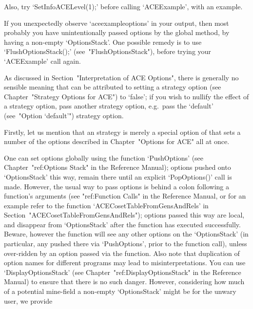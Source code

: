 Also, try `SetInfoACELevel(1);' before  calling `ACEExample', with  an
example.

If you unexpectedly observe `aceexampleoptions' in your  output,  then
most probably you have unintentionally passed options  by  the  global
method, by having a non-empty `OptionsStack'. One possible  remedy  is
to use `FlushOptionsStack();' (see~"FlushOptionsStack"), before trying
your `ACEExample' call again.

As discussed in Section~"Interpretation  of  ACE  Options",  there  is
generally no sensible meaning that can  be  attributed  to  setting  a
strategy option (see Chapter~"Strategy Options for ACE")  to  `false';
if you wish to nullify the effect of a strategy option,  pass  another
strategy option,  e.g.~pass  the  `default'  (see~"Option  `default'")
strategy option.

\enditems

Firstly, let us mention that an {\ACE} strategy is  merely  a  special
option of {\ACE} that sets  a  number  of  the  options  described  in
Chapter~"Options for ACE" all at once.

\beginitems

One can set options globally using  the  function  `PushOptions'  (see
Chapter~"ref:Options Stack" in the {\GAP} Reference  Manual);  options
pushed onto `OptionsStack' this way, remain there  until  an  explicit
`PopOptions()' call is made. However, the usual way to pass options is
behind a colon following a  function's  arguments  (see  "ref:Function
Calls" in the {\GAP} Reference Manual, or for an example refer to  the
function               `ACECosetTableFromGensAndRels'               in
Section~"ACECosetTableFromGensAndRels"); options passed this  way  are
local, and  disappear  from  `OptionsStack'  after  the  function  has
executed successfully. Beware, however the function will see any other
options on the `OptionsStack' (in particular,  any  pushed  there  via
`PushOptions', prior to the function call), unless over-ridden  by  an
option passed via the function. Also note that duplication  of  option
names for different programs may lead to misinterpretations.  You  can
use `DisplayOptionsStack'  (see  Chapter~"ref:DisplayOptionsStack"  in
the {\GAP} Reference Manual) to ensure that there is no  such  danger.
However, considering how much of a potential  mine-field  a  non-empty
`OptionsStack' might be for the unwary user, we provide

